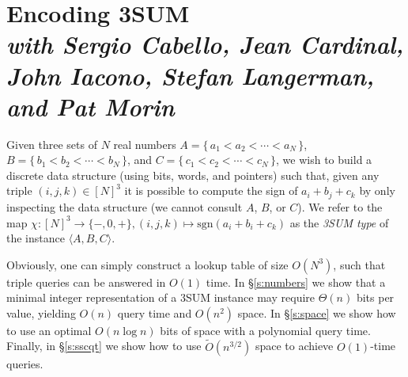 \chapter%
[Encoding 3SUM]%
{Encoding 3SUM\\[1ex]
\normalfont\footnotesize\itshape with
Sergio Cabello,
Jean Cardinal,
John Iacono,
Stefan Langerman,
and
Pat Morin}%
\label{paper:3sum-encoding}

Given three sets of \(N\) real numbers
\(A = \{\, a_1 < a_2 < \cdots < a_N\,\} \),
\(B = \{\, b_1 < b_2 < \cdots < b_N\,\} \),
and \(C = \{\, c_1 < c_2 < \cdots < c_N\,\}\),
we wish to build a discrete data structure (using bits, words, and pointers) such that,
given any triple \((i,j,k) \in {[N]}^3\) it is possible to compute the sign of
\(a_i + b_j + c_k\) by only inspecting the data structure (we cannot consult
\(A\), \(B\), or \(C\)).
We refer to the map $\chi : {[N]}^3\to \{-,0,+\}, (i,j,k)\mapsto\mathrm{sgn}
(a_i+b_i+c_k)$ as the {\em 3SUM type} of the instance $\langle A,B,C \rangle$.

Obviously, one can simply construct a lookup table of size \(O(N^3)\), such
that triple queries can be answered in \(O(1)\) time.
%
In \S\ref{s:numbers} we show that a minimal integer representation of a
3SUM instance may require $\Theta(n)$ bits per value, yielding
$O(n)$ query time and $O(n^2)$ space.
%
In \S\ref{s:space} we show how to use an optimal $O(n \log n)$ bits of
space with a polynomial query time. Finally, in \S\ref{s:sscqt} we show
how to use $\tilde{O}(n^{3/2})$ space to achieve $O(1)$-time queries.


